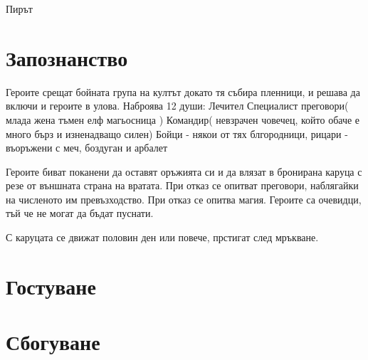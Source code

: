 \documentclass{article}
\begin{document}
{\huge Пирът}
\section{Запознанство}
Героите срещат бойната група на култът докато тя събира пленници, и решава да включи и героите в улова.
Наброява 12 души:
Лечител
Специалист преговори( млада жена тъмен елф магьосница )
Командир( невзрачен човечец, който обаче е много бърз и изненадващо силен)
Бойци - някои от тях блгородници, рицари - въоръжени с меч, боздуган и арбалет

Героите биват поканени да оставят оръжията си и да влязат в бронирана каруца с резе от външната страна на вратата.
При отказ се опитват преговори, наблягайки на численото им превъзходство.
При отказ се опитва магия.
Героите са очевидци, тъй че не могат да бъдат пуснати.

С каруцата се движат половин ден или повече, прстигат след мръкване.

\section{Гостуване}

\section{Сбогуване}

\section{}
\end{document}
